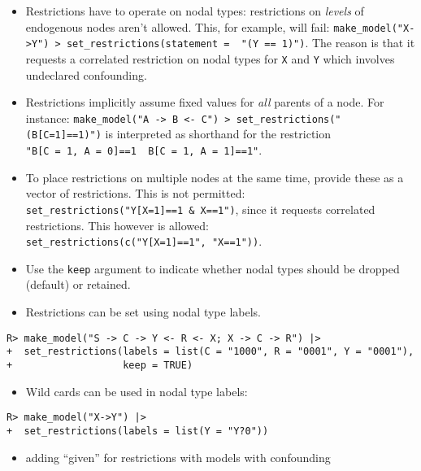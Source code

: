 \documentclass[
  11pt,
  article]{jss}
\providecommand{\tightlist}{%
  \setlength{\itemsep}{0pt}\setlength{\parskip}{0pt}}\usepackage{longtable,booktabs,array}
\begin{document}
\begin{itemize}
\tightlist
\item
  Restrictions have to operate on nodal types: restrictions on
  \emph{levels} of endogenous nodes aren't allowed. This, for example,
  will fail:
  \texttt{make\_model("X-\textgreater{}Y")\ \textbar{}\textgreater{}\ set\_restrictions(statement\ =\ \ "(Y\ ==\ 1)")}.
  The reason is that it requests a correlated restriction on nodal types
  for \texttt{X} and \texttt{Y} which involves undeclared confounding.
\item
  Restrictions implicitly assume fixed values for \emph{all} parents of
  a node. For instance:
  \texttt{make\_model("A\ -\textgreater{}\ B\ \textless{}-\ C")\ \textbar{}\textgreater{}\ set\_restrictions("(B{[}C=1{]}==1)")}
  is interpreted as shorthand for the restriction
  \texttt{"B{[}C\ =\ 1,\ A\ =\ 0{]}==1\ \textbar{}\ B{[}C\ =\ 1,\ A\ =\ 1{]}==1"}.
\item
  To place restrictions on multiple nodes at the same time, provide
  these as a vector of restrictions. This is not permitted:
  \texttt{set\_restrictions("Y{[}X=1{]}==1\ \&\ X==1")}, since it
  requests correlated restrictions. This however is allowed:
  \texttt{set\_restrictions(c("Y{[}X=1{]}==1",\ "X==1"))}.\\
\item
  Use the \texttt{keep} argument to indicate whether nodal types should
  be dropped (default) or retained.
\item
  Restrictions can be set using nodal type labels.
\end{itemize}

\begin{verbatim}
R> make_model("S -> C -> Y <- R <- X; X -> C -> R") |>
+  set_restrictions(labels = list(C = "1000", R = "0001", Y = "0001"), 
+                   keep = TRUE)
\end{verbatim}

\begin{itemize}
\tightlist
\item
  Wild cards can be used in nodal type labels:
\end{itemize}

\begin{verbatim}
R> make_model("X->Y") |>
+  set_restrictions(labels = list(Y = "Y?0"))
\end{verbatim}

\begin{itemize}
\tightlist
\item
  adding ``given'' for restrictions with models with confounding
\end{itemize}
\end{document}
